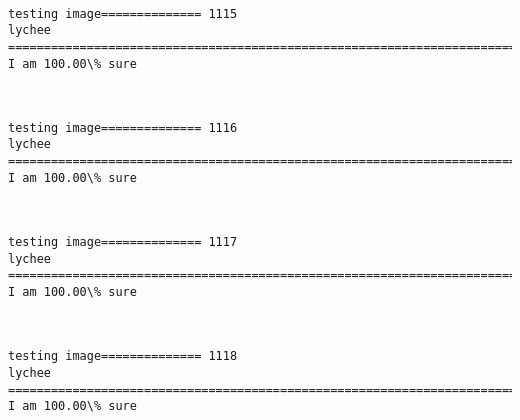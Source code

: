 \documentclass[11pt]{article}
\begin{document}
    \begin{center}
    \end{center}
    { \hspace*{\fill} \\}
    
    \begin{Verbatim}[commandchars=\\\{\}]
testing image============== 1115
lychee
============================================================================
I am 100.00\% sure

    \end{Verbatim}

    \begin{center}
    \end{center}
    { \hspace*{\fill} \\}
    
    \begin{Verbatim}[commandchars=\\\{\}]
testing image============== 1116
lychee
============================================================================
I am 100.00\% sure

    \end{Verbatim}

    \begin{center}
    \end{center}
    { \hspace*{\fill} \\}
    
    \begin{Verbatim}[commandchars=\\\{\}]
testing image============== 1117
lychee
============================================================================
I am 100.00\% sure

    \end{Verbatim}

    \begin{center}
    \end{center}
    { \hspace*{\fill} \\}
    
    \begin{Verbatim}[commandchars=\\\{\}]
testing image============== 1118
lychee
============================================================================
I am 100.00\% sure

    \end{Verbatim}
\end{document}
